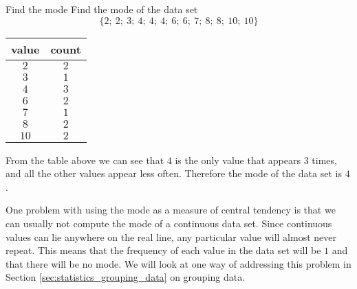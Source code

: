 \begin{wex}{Find the mode}{
    Find the mode of the data set
    \begin{equation}
      \{2;\ 2;\ 3;\ 4;\ 4;\ 4;\ 6;\ 6;\ 7;\ 8;\ 8;\ 10;\ 10\}
    \end{equation}
}{

  \begin{center}
    \begin{tabular}{cc}
      \toprule
      value & count \\
      \midrule
      $2$ & $2$ \\
      $3$ & $1$ \\
      $4$ & $3$ \\
      $6$ & $2$ \\
      $7$ & $1$ \\
      $8$ & $2$ \\
      $10$ & $2$ \\
      \bottomrule
    \end{tabular}
  \end{center}


  From the table above we can see that $4$ is the only value that
  appears $3$ times, and all the other values appear less
  often. Therefore the mode of the data set is $4$.

}
\end{wex}

One problem with using the mode as a measure of central tendency is
that we can usually not compute the mode of a continuous data
set. Since continuous values can lie anywhere on the real line, any
particular value will almost never repeat. This means that the
frequency of each value in the data set will be $1$ and that there will
be no mode. We will look at one way of addressing this problem in
Section \ref{sec:statistics_grouping_data} on grouping data.

